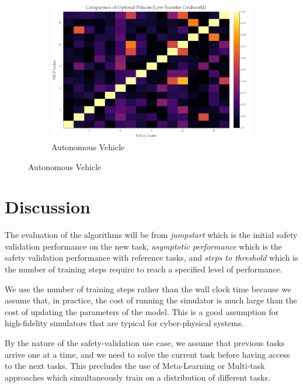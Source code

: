 \begin{figure}
\begin{subfigure}[b]{0.6\textwidth}
        \includegraphics[width=\textwidth]{figures/iterative_validation/low_transfer_heatmap.png}
        \caption{Autonomous Vehicle}  
        \label{fig:ivm_locally_optimal}
    \end{subfigure}
\end{figure}

\section{Discussion}

\cite{taylor2009transfer}

The evaluation of the algorithms will be from \emph{jumpstart} which is the initial safety validation performance on the new task, \emph{asymptotic performance} which is the safety validation performance with reference tasks, and \emph{steps to threshold} which is the number of training steps require to reach a specified level of performance.

We use the number of training steps rather than the wall clock time because we assume that, in practice, the cost of running the simulator is much large than the cost of updating the parameters of the model. This is a good assumption for high-fidelity simulators that are typical for cyber-physical systems.

By the nature of the safety-validation use case, we assume that previous tasks arrive one at a time, and we need to solve the current task before having access to the next tasks. This precludes the use of Meta-Learning or Multi-task approaches which simultaneously train on a distribution of different tasks. 


